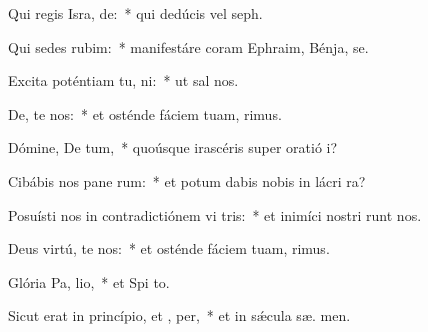 \item Qui regis Isra, de:~* qui dedúcis vel  seph.
\item Qui sedes  rubim:~* manifestáre coram Ephraim, Bénja,  se.
\item Excita poténtiam tu,  ni:~* ut sal  nos.
\item De, te nos:~* et osténde fáciem tuam,   rimus.
\item Dómine, De tum,~* quoúsque irascéris super oratió  i?
\item Cibábis nos pane rum:~* et potum dabis nobis in lácri  ra?
\item Posuísti nos in contradictiónem vi tris:~* et inimíci nostri runt nos.
\item Deus virtú, te nos:~* et osténde fáciem tuam,   rimus.
\item Glória Pa,  lio,~* et Spi to.
\item Sicut erat in princípio, et ,  per,~* et in sǽcula sæ. men.
